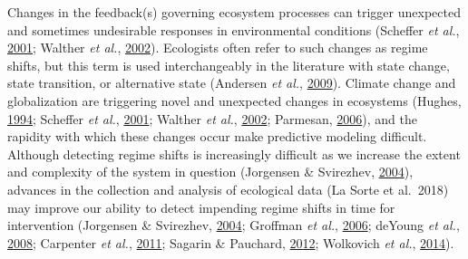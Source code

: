 \documentclass[print]{nuthesis}
\begin{document}
Changes in the feedback(s) governing ecosystem processes can trigger unexpected and sometimes undesirable responses in environmental conditions (Scheffer \emph{et al.}, \protect\hyperlink{ref-scheffer_catastrophic_2001}{2001}; Walther \emph{et al.}, \protect\hyperlink{ref-walther_ecological_2002}{2002}). Ecologists often refer to such changes as regime shifts, but this term is used interchangeably in the literature with state change, state transition, or alternative state (Andersen \emph{et al.}, \protect\hyperlink{ref-andersen_ecological_2009}{2009}). Climate change and globalization are triggering novel and unexpected changes in ecosystems (Hughes, \protect\hyperlink{ref-hughes_catastrophes_1994}{1994}; Scheffer \emph{et al.}, \protect\hyperlink{ref-scheffer_catastrophic_2001}{2001}; Walther \emph{et al.}, \protect\hyperlink{ref-walther_ecological_2002}{2002}; Parmesan, \protect\hyperlink{ref-parmesan_ecological_2006}{2006}), and the rapidity with which these changes occur make predictive modeling difficult. Although detecting regime shifts is increasingly difficult as we increase the extent and complexity of the system in question (Jorgensen \& Svirezhev, \protect\hyperlink{ref-jorgensen_towards_2004}{2004}), advances in the collection and analysis of ecological data (La Sorte et al.~2018) may improve our ability to detect impending regime shifts in time for intervention (Jorgensen \& Svirezhev, \protect\hyperlink{ref-jorgensen_towards_2004}{2004}; Groffman \emph{et al.}, \protect\hyperlink{ref-groffman_ecological_2006}{2006}; deYoung \emph{et al.}, \protect\hyperlink{ref-deyoung_regime_2008}{2008}; Carpenter \emph{et al.}, \protect\hyperlink{ref-carpenter2011early}{2011}; Sagarin \& Pauchard, \protect\hyperlink{ref-sagarin_observation_2012}{2012}; Wolkovich \emph{et al.}, \protect\hyperlink{ref-wolkovich_temporal_2014}{2014}).
\end{document}

